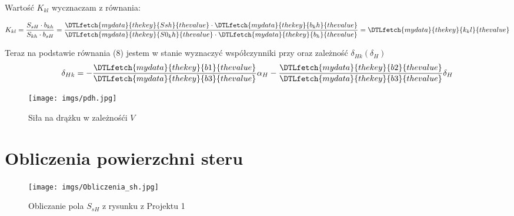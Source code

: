 \documentclass[12pt]{sprawozdanie}
\newcommand{\PlaneVar}[1]{\DTLfetch{mydata}{thekey}{#1}{thevalue}}
\begin{document}
Wartość $K_{kl}$ wycznaczam z równania:

\begin{equation}
    K_{kl} = \frac{S_{sH} \cdot b_{kh}}{S_{kh}\cdot b_{sH}} = \frac{\PlaneVar{Ssh}\cdot \PlaneVar{b_kh}}{\PlaneVar{S0_kh}\cdot \PlaneVar{b_h}} = \PlaneVar{k_kl}
\end{equation}

Teraz na podstawie równania (8) jestem w stanie wyznaczyć współczynniki przy oraz zależność $\delta_{Hk}(\delta_H)$ 
\begin{equation}
    \delta_{Hk} = - \frac{\PlaneVar{b1}}{\PlaneVar{b3}}\alpha_H -\frac{\PlaneVar{b2}}{\PlaneVar{b3}}\delta_H 
\end{equation}

\begin{figure}[h!]
    \centering
    \texttt{[image: imgs/pdh.jpg]}

    \caption{Siła na drążku w zależnośći $V$}
    \label{fig:deltahv}
\end{figure}
\FloatBarrier



\appendix
\chapter{Obliczenia powierzchni steru}\label{appendix:obl}
\begin{figure}[h!]
    \centering
    \texttt{[image: imgs/Obliczenia\_sh.jpg]}
    \caption{Obliczanie pola $S_{sH}$ z rysunku z Projektu 1 \cite{Proj1}}
    \label{fig:Ssh}
\end{figure}
\FloatBarrier



\end{document}
